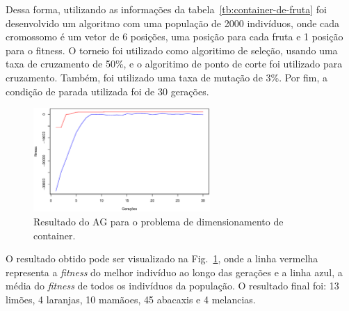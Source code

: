 \documentclass[12pt]{article}
\begin{document}
Dessa forma, utilizando as informações da tabela~\ref{tb:container-de-fruta} foi desenvolvido
um algoritmo com uma população de 2000 indivíduos, onde cada cromossomo é um vetor de 6 posições,
uma posição para cada fruta e 1 posição para o fitness. O torneio foi utilizado como algoritimo de
seleção, usando uma taxa de cruzamento de 50\%, e o algoritimo de ponto de corte foi utilizado
para cruzamento. Também, foi utilizado uma taxa de mutação de 3\%. Por fim, a condição de parada
utilizada foi de 30 gerações.

\begin{figure}[htb]
	\begin{center}
	\includegraphics[width=0.6\textwidth]{./imgs/result-ag.eps}
	\caption{Resultado do AG para o problema de dimensionamento de container.\label{fig:result}}
	\end{center}
\end{figure}

O resultado obtido pode ser visualizado na Fig.~\ref{fig:result}, onde a linha vermelha representa
a \textit{fitness} do melhor indivíduo ao longo das gerações e a linha azul, a média do \textit{fitness}
de todos os indivíduos da população. O resultado final foi: 13 limões, 4 laranjas, 10 mamãoes, 45 abacaxis
e 4 melancias.
\end{document}

